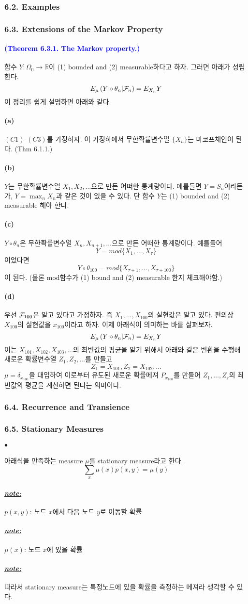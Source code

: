 \documentclass[12pt,oneside,english]{book}
\def\ck{\paragraph{\Large$\bullet$}\Large}
\def\note{\paragraph{\Large\textit{\underline{note:}}}\Large}
\newcommand{\parablue}[1]{\paragraph{\Large\textcolor{blue}{(#1)}}\Large}
\def\cka{\paragraph{\Large(a)}\Large}
\def\ckb{\paragraph{\Large(b)}\Large}
\def\ckc{\paragraph{\Large(c)}\Large}
\def\ckd{\paragraph{\Large(d)}\Large}
\begin{document}
\subsubsection{6.2. Examples}

\subsubsection{6.3. Extensions of the Markov Property}

\parablue{Theorem 6.3.1. The Markov property.} 함수 $Y:\Omega_0 \to \mathbb{R}$이 (1) bounded and (2) measurable하다고 하자. 그러면 아래가 성립한다. 
\[
E_{\mu}\left(Y \circ \theta_n|{\cal F}_n \right)= E_{X_n} Y
\]
이 정리를 쉽게 설명하면 아래와 같다. 
\cka $(C1)$-$(C3)$를 가정하자. 이 가정하에서 무한확률변수열 $\{X_n\}$는 마코프체인이 된다. (Thm 6.1.1.)
\ckb $Y$는 무한확률변수열 $X_1,X_2,\dots$으로 만든 어떠한 통계량이다. 예를들면 $Y=S_n$이라든가, $Y=\max_n X_n$과 같은 것이 있을 수 있다. 단 함수 $Y$는 (1) bounded and (2) measurable 해야 한다. 
\ckc $Y \circ \theta_n$은 무한확률변수열 $X_n,X_{n+1},\dots$으로 만든 어떠한 통계량이다. 예를들어 
\[
Y=mod\{X_1,\dots,X_{\tau}\}
\]
이었다면 
\[
Y\circ \theta_{100}=mod\{X_{\tau+1},\dots,X_{\tau+100}\}
\]
이 된다. (물론 mod함수가 (1) bound and (2) measurable 한지 체크해야함.)
\ckd 우선 ${\cal F}_{100}$은 알고 있다고 가정하자. 즉 $X_1,\dots,X_{100}$의 실현값은 알고 있다. 편의상 $X_{100}$의 실현값을 $x_{100}$이라고 하자. 이제 아래식이 의미하는 바를 살펴보자. 
\[
E_{\mu}\left(Y \circ \theta_n|{\cal F}_n \right)= E_{X_n} Y
\]
이는 $X_{101},X_{102},X_{103},\dots$의 최빈값의 평균을 알기 위해서 아래와 같은 변환을 수행해 새로운 확률변수열 $Z_1,Z_2,\dots$를 만들고 
\[
Z_{1}=X_{101}, Z_2=X_{102},\dots
\]
$\mu=\delta_{x_{100}}$을 대입하여 이로부터 유도된 새로운 확률메져 $P_{x_{100}}$를 만들어 $Z_1,\dots,Z_{\tau}$의 최빈값의 평균을 계산하면 된다는 의미이다. 


\subsubsection{6.4. Recurrence and Transience}

\subsubsection{6.5. Stationary Measures}
\ck 아래식을 만족하는 measure $\mu$를 stationary measure라고 한다. 
\[
\sum_x\mu(x)p(x,y)=\mu(y)
\]
\note $p(x,y)$: 노드 $x$에서 다음 노드 $y$로 이동할 확률
\note $\mu(x)$: 노드 $x$에 있을 확률
\note 따라서 stationary measure는 특정노드에 있을 확률을 측정하는 메져라 생각할 수 있다. 
\end{document}
